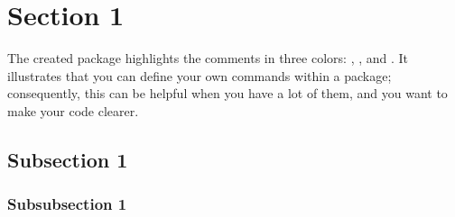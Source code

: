 
\section{Section 1}

  The created package highlights the comments in three colors: , , and .  It illustrates that you can define your own commands within a package; consequently, this can be helpful when you have a lot of them, and you want to make your code clearer.

  \subsection{Subsection 1}

    \lipsum

    \subsubsection{Subsubsection 1}

      \lipsum
      \lipsum[1-4]
      \pagebreak
